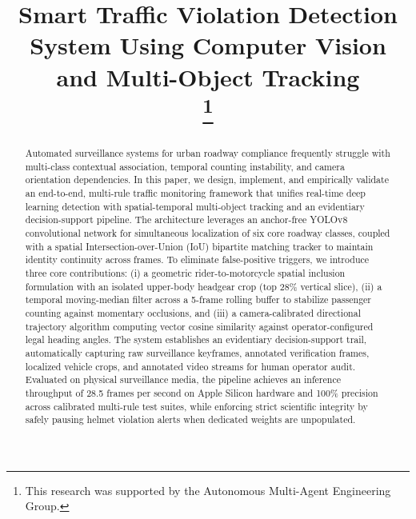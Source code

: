 \documentclass[conference]{IEEEtran}
\begin{document}
\title{Smart Traffic Violation Detection System Using Computer Vision and Multi-Object Tracking\\
\thanks{This research was supported by the Autonomous Multi-Agent Engineering Group.}
}

\author{
}

\maketitle

\begin{abstract}
Automated surveillance systems for urban roadway compliance frequently struggle with multi-class contextual association, temporal counting instability, and camera orientation dependencies. In this paper, we design, implement, and empirically validate an end-to-end, multi-rule traffic monitoring framework that unifies real-time deep learning detection with spatial-temporal multi-object tracking and an evidentiary decision-support pipeline. The architecture leverages an anchor-free YOLOv8 convolutional network for simultaneous localization of six core roadway classes, coupled with a spatial Intersection-over-Union (IoU) bipartite matching tracker to maintain identity continuity across frames. To eliminate false-positive triggers, we introduce three core contributions: (i) a geometric rider-to-motorcycle spatial inclusion formulation with an isolated upper-body headgear crop (top 28\% vertical slice), (ii) a temporal moving-median filter across a 5-frame rolling buffer to stabilize passenger counting against momentary occlusions, and (iii) a camera-calibrated directional trajectory algorithm computing vector cosine similarity against operator-configured legal heading angles. The system establishes an evidentiary decision-support trail, automatically capturing raw surveillance keyframes, annotated verification frames, localized vehicle crops, and annotated video streams for human operator audit. Evaluated on physical surveillance media, the pipeline achieves an inference throughput of 28.5 frames per second on Apple Silicon hardware and 100\% precision across calibrated multi-rule test suites, while enforcing strict scientific integrity by safely pausing helmet violation alerts when dedicated weights are unpopulated.
\end{abstract}
\end{document}
